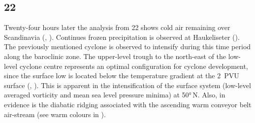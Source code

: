 \subsection*{\SI{22}{\dec}}
Twenty-four hours later the analysis from \SI{22}{\dec} shows cold air remaining over Scandinavia (, ). Continues frozen precipitation is observed at Haukeliseter ().
\\
The previously mentioned cyclone is observed to intensify during this time period along the baroclinic zone. The upper-level trough to the north-east of the low-level cyclone centre represents an optimal configuration for cyclone development, since the surface low is located below the temperature gradient at the \SI{2}{PVU} surface (, ). This is apparent in the intensification of the surface system (low-level averaged vorticity and mean sea level pressure minima) at \ang{50}{\,N}.  Also, in evidence is the diabatic ridging associated with the ascending warm conveyor belt air-stream (see warm colours in ).
